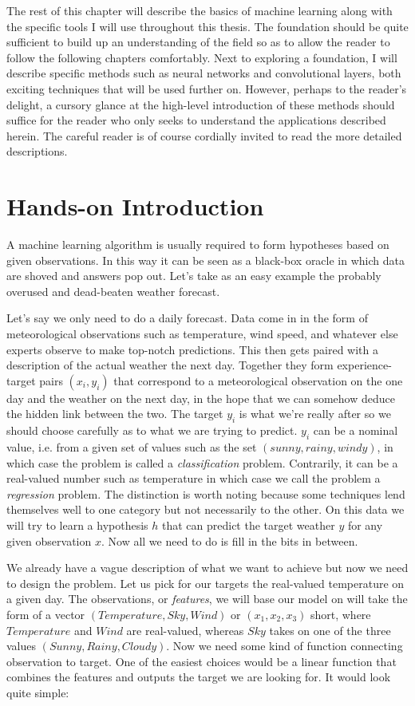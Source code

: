 The rest of this chapter will describe the basics of machine learning
along with the specific tools I will use throughout this thesis.
The foundation should be quite sufficient to build up
an understanding of the field
so as to allow the reader to follow the following chapters comfortably.
Next to exploring a foundation,
I will describe specific methods such as neural networks
and convolutional layers,
both exciting techniques that will be used further on.
However, perhaps to the reader's delight,
a cursory glance at the high-level introduction of these methods
should suffice for the reader who only seeks to understand
the applications described herein.
The careful reader is of course cordially invited
to read the more detailed descriptions.


\section{Hands-on Introduction}
A machine learning algorithm
is usually required to form hypotheses
based on given observations.
In this way it can be seen as
a black-box oracle
in which data are shoved
and answers pop out.
Let's take as an easy example
the probably overused and dead-beaten weather forecast.

Let's say we only need to do a daily forecast.
Data come in in the form of meteorological observations
such as temperature, wind speed, and whatever else
experts observe to make top-notch predictions.
This then gets paired
with a description of the actual weather the next day.
Together they form experience-target pairs
$(x_i, y_i)$
that correspond to a meteorological observation
on the one day and the weather on the next day,
in the hope that we can somehow deduce the hidden
link between the two.
The target $y_i$ is what we're really after
so we should choose carefully as to what we are trying to predict.
$y_i$ can be a nominal value,
i.e. from a given set of values
such as the set $(sunny, rainy, windy)$,
in which case the problem is called a \textit{classification} problem.
Contrarily, it can be a real-valued number such as temperature
in which case we call the problem a \textit{regression} problem.
The distinction is worth noting because
some techniques lend themselves well to
one category but not necessarily to the other.
On this data we will try to learn a hypothesis $h$
that can predict the target weather $y$
for any given observation $x$.
Now all we need to do is fill in the bits in between.

We already have a vague description of what we want to achieve
but now we need to design the problem.
Let us pick for our targets the real-valued temperature on a given day.
The observations, or \textit{features}, we will base our model on
will take the form of a vector
$(Temperature, Sky, Wind)$ or $(x_1, x_2, x_3)$ short,
where $Temperature$ and $Wind$ are real-valued,
whereas $Sky$ takes on one of the three values
$(Sunny, Rainy, Cloudy)$.
Now we need some kind of function connecting
observation to target.
One of the easiest choices would be a linear
function that combines the features
and outputs the target we are looking for.
It would look quite simple:

